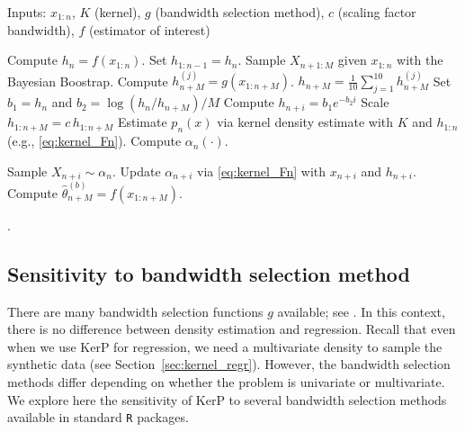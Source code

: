 \documentclass{article}
\theoremstyle{definition}
\renewcommand{\&}{and}
\begin{document}
\begin{algorithm}[!t]
\label{alg:KerP}
\caption{KerP predictive resampling (with bandwidth selection)}

\footnotesize
  Inputs: $x_{1:n}$, $K$ (kernel), $g$ (bandwidth selection method), $c$ (scaling factor bandwidth), $f$ (estimator of interest) \\

\begin{algorithmic}[1]
  \State Compute $h_n=f(x_{1:n})$. 
  \State Set $h_{1:n-1}=h_n$.
   
   \State Sample $X_{n+1:M}$ given $x_{1:n}$ with the Bayesian Boostrap.
   \State Compute $h^{(j)}_{n+M}=g(x_{1:n+M})$.
  \EndFor
  \State  $h_{n+M}=\frac{1}{10} \sum_{j=1}^{10} h^{(j)}_{n+M}$
  \State Set $b_1=h_n$ and $b_2 = \log (h_n/h_{n+M})/M$ 
  \State Compute $h_{n+i}=b_1 e^{-b_2 i}$
  \EndFor
  \State Scale $h_{1:n+M}=c \, h_{1:n+M}$
  \State Estimate $p_n(x)$ via kernel density estimate with $K$ and $h_{1:n}$ (e.g., \eqref{eq:kernel_Fn}).  
  \State Compute $\alpha_n(\cdot)$.
  
   
  \State Sample $X_{n+i}\sim \alpha_n$.
  \State Update $\alpha_{n+i}$ via \eqref{eq:kernel_Fn} with $x_{n+i}$ and $h_{n+i}$.
  \EndFor
  \State Compute $\hat{\theta}^{(b)}_{n+M}=f(x_{1:n+M})$.
  \EndFor
\end{algorithmic}
  .
\end{algorithm}


\subsection{Sensitivity to bandwidth selection method}\label{sec:sensitivity_bw}

There are many bandwidth selection functions $g$ available; see \cite{jones1996brief}. In this context, there is no difference between density estimation and regression. Recall that even when we use KerP for regression, we need a multivariate density to sample the synthetic data (see Section~\ref{sec:kernel_regr}). However, the bandwidth selection methods differ depending on whether the problem is univariate or multivariate. We explore here the sensitivity of KerP to several bandwidth selection methods available in standard \texttt{R} packages.
\end{document}
